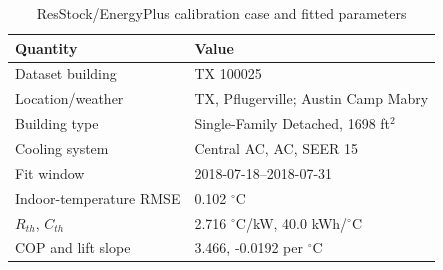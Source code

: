 \begin{table}[!t]
\caption{ResStock/EnergyPlus calibration case and fitted parameters}
\label{tab:resstock_calibration}
\centering
\begin{tabular}{ll}
\toprule
Quantity & Value \\
\midrule
Dataset building & TX 100025 \\
Location/weather & TX, Pflugerville; Austin Camp Mabry \\
Building type & Single-Family Detached, 1698 ft$^2$ \\
Cooling system & Central AC, AC, SEER 15 \\
Fit window & 2018-07-18--2018-07-31 \\
Indoor-temperature RMSE & 0.102 $^\circ$C \\
$R_{th}$, $C_{th}$ & 2.716 $^\circ$C/kW, 40.0 kWh/$^\circ$C \\
COP and lift slope & 3.466, -0.0192 per $^\circ$C \\
\bottomrule
\end{tabular}
\end{table}
